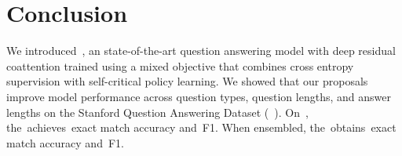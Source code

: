 \documentclass{article} %
\begin{document}

\section{Conclusion}
\vspace{-2mm}


We introduced~\modelname, an state-of-the-art question answering model with deep residual coattention trained using a mixed objective that combines cross entropy supervision with self-critical policy learning.
We showed that our proposals improve model performance across question types, question lengths, and answer lengths on the Stanford Question Answering Dataset (~\squad).
On~\squad, the~\modelname achieves~\emours exact match accuracy and~\fours F1.
When ensembled, the~\modelname obtains~\emoursensemble exact match accuracy and~\foursensemble F1.




\end{document}
